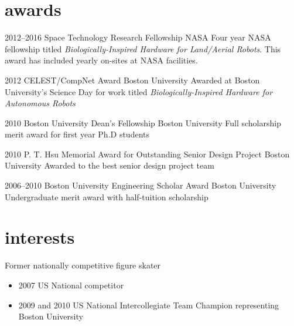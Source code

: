 \documentclass[print]{friggeri-cv} %
\begin{document}
\clearpage
{}

\section{awards}

\begin{entrylist}


\entry
{2012--2016}
{Space Technology Research Fellowship}
{NASA}
{Four year NASA fellowship titled \emph{Biologically-Inspired Hardware for Land/Aerial Robots}. This award has included yearly on-sites at NASA facilities.}

\entry
{2012}
{CELEST/CompNet Award}
{Boston University}
{Awarded at Boston University's Science Day for work titled \emph{Biologically-Inspired Hardware for Autonomous Robots}}

\entry
{2010}
{Boston University Dean's Fellowship}
{Boston University}
{Full scholarship merit award for first year Ph.D students}

\entry
{2010}
{P. T. Hsu Memorial Award for Outstanding Senior Design Project}
{Boston University}
{Awarded to the best senior design project team}

\entry
{2006--2010}
{Boston University Engineering Scholar Award}
{Boston University}
{Undergraduate merit award with half-tuition scholarship}


\end{entrylist}



\section{interests}
Former nationally competitive figure skater
\begin{itemize}
\item 2007 US National competitor
\item 2009 and 2010 US National Intercollegiate Team Champion representing Boston University
\end{itemize}
\end{document}
